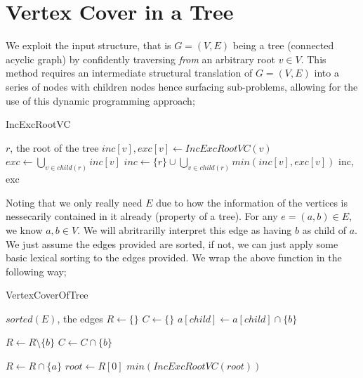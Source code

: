 \documentclass{article}
\begin{document}
\section*{Vertex Cover in a Tree}
We exploit the input structure, that is $G = (V,E)$ being a tree (connected acyclic graph) by confidently traversing {\em from} an arbitrary root $v \in V$. This method requires an intermediate structural translation of $G = (V, E)$ into a series of nodes with children nodes hence surfacing sub-problems, allowing for the use of this dynamic programming approach;

\vspace{1em}
\begin{algorithm} \caption{IncExcRootVC}
\begin{algorithmic}[1]
\Require $r$, the root of the tree
\State $inc[v], exc[v] \gets IncExcRootVC(v)$
\EndFor
\State $exc \gets \bigcup_{v \in child(r)} inc[v]$
\State $inc \gets \{r\} \cup \bigcup_{v \in child(r)} min(inc[v], exc[v])$
\State \Return inc, exc
\end{algorithmic}
\end{algorithm}

Noting that we only really need $E$ due to how the information of the vertices is nessecarily contained in it already (property of a tree). For any $e = (a, b) \in E$, we know $a,b \in V$. We will abritrarilly interpret this edge as having $b$ as child of $a$. We just assume the edges provided are sorted, if not, we can just apply some basic lexical sorting to the edges provided. We wrap the above function in the following way;

\vspace{1em}
\begin{algorithm} \caption{VertexCoverOfTree}
\begin{algorithmic}[1]
\Require $sorted(E)$, the edges
\State $R \gets \{\}$
\State $C \gets \{\}$
\State $a[child] \gets a[child] \cap \{b\}$

\State $R \gets R \setminus \{b\}$
\State $C \gets C \cap \{b\}$

\State $R \gets R \cap \{a\}$
\EndIf
\EndFor
\State $root \gets R[0]$
\State \Return $min(IncExcRootVC(root))$
\end{algorithmic}
\end{algorithm}
\end{document}
